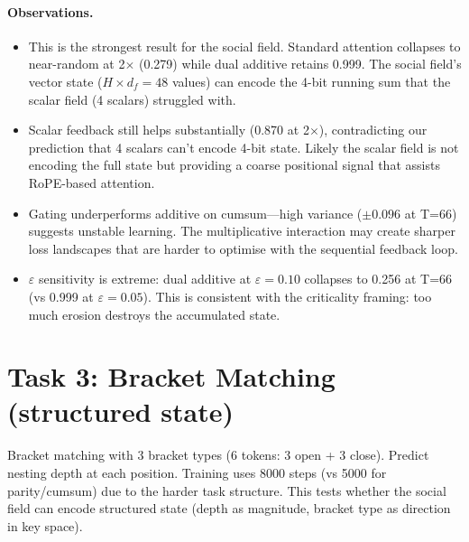 \documentclass[11pt,a4paper]{article}
\begin{document}
\paragraph{Observations.}
\begin{itemize}
    \item This is the strongest result for the social field.
          Standard attention collapses to near-random at 2$\times$
          (0.279) while dual additive retains 0.999.  The social
          field's vector state ($H \times d_f = 48$ values) can
          encode the 4-bit running sum that the scalar field
          (4 scalars) struggled with.
    \item Scalar feedback still helps substantially (0.870 at
          2$\times$), contradicting our prediction that 4 scalars
          can't encode 4-bit state.  Likely the scalar field is not
          encoding the full state but providing a coarse positional
          signal that assists RoPE-based attention.
    \item Gating underperforms additive on cumsum---high variance
          ($\pm 0.096$ at T=66) suggests unstable learning.  The
          multiplicative interaction may create sharper loss
          landscapes that are harder to optimise with the sequential
          feedback loop.
    \item $\varepsilon$ sensitivity is extreme: dual additive at
          $\varepsilon\!=\!0.10$ collapses to 0.256 at T=66
          (vs 0.999 at $\varepsilon\!=\!0.05$).  This is consistent
          with the criticality framing: too much erosion destroys
          the accumulated state.
\end{itemize}


\section{Task 3: Bracket Matching (structured state)}

Bracket matching with 3 bracket types (6 tokens: 3 open + 3 close).
Predict nesting depth at each position.  Training uses 8000 steps
(vs 5000 for parity/cumsum) due to the harder task structure.
This tests whether the social field can encode structured state
(depth as magnitude, bracket type as direction in key space).
\end{document}
